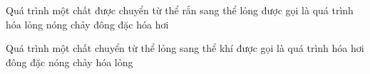 \begin{ex}
	{\color{red}\footnotesize\ttfamily [L12C1B1-TN-25]}\par %
	Quá trình một chất được chuyển từ thể rắn sang thể lỏng được gọi là quá trình
	\choice
	{hóa lỏng}
	{\True nóng chảy}
	{đông đặc}
	{hóa hơi}
\end{ex}

\begin{ex}
	{\color{red}\footnotesize\ttfamily [L12C1B1-TN-26]}\par %
	Quá trình một chất chuyển từ thể lỏng sang thể khí được gọi là quá trình
	\choice
	{\True hóa hơi}
	{đông đặc}
	{nóng chảy}
	{hóa lỏng}
\end{ex}


